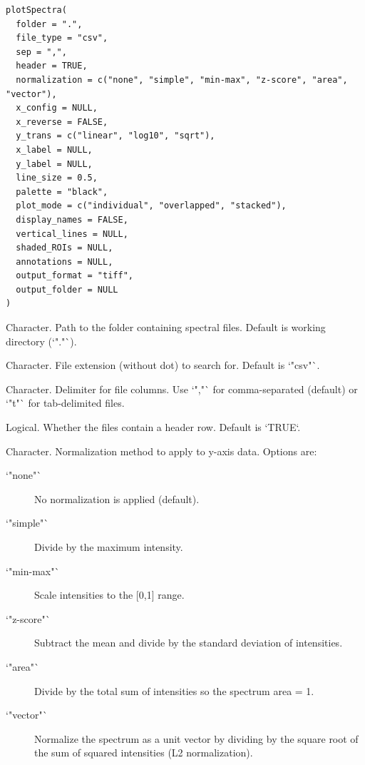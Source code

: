 \documentclass[a4paper]{book}
\begin{document}
%
\begin{Usage}
\begin{verbatim}
plotSpectra(
  folder = ".",
  file_type = "csv",
  sep = ",",
  header = TRUE,
  normalization = c("none", "simple", "min-max", "z-score", "area", "vector"),
  x_config = NULL,
  x_reverse = FALSE,
  y_trans = c("linear", "log10", "sqrt"),
  x_label = NULL,
  y_label = NULL,
  line_size = 0.5,
  palette = "black",
  plot_mode = c("individual", "overlapped", "stacked"),
  display_names = FALSE,
  vertical_lines = NULL,
  shaded_ROIs = NULL,
  annotations = NULL,
  output_format = "tiff",
  output_folder = NULL
)
\end{verbatim}
\end{Usage}
%
\begin{Arguments}
\begin{ldescription}
\item[\code{folder}] Character. Path to the folder containing spectral files. Default is working directory (`"."`).

\item[\code{file\_type}] Character. File extension (without dot) to search for. Default is `"csv"`.

\item[\code{sep}] Character. Delimiter for file columns. Use `","` for comma-separated (default) or `"\bsl{}t"` for tab-delimited files.

\item[\code{header}] Logical. Whether the files contain a header row. Default is `TRUE`.

\item[\code{normalization}] Character. Normalization method to apply to y-axis data. Options are:
\begin{description}

\item[`"none"`] No normalization is applied (default).
\item[`"simple"`] Divide by the maximum intensity.
\item[`"min-max"`] Scale intensities to the [0,1] range.
\item[`"z-score"`] Subtract the mean and divide by the standard deviation of intensities.
\item[`"area"`] Divide by the total sum of intensities so the spectrum area = 1.
\item[`"vector"`] Normalize the spectrum as a unit vector by dividing by the square root of the sum of squared intensities (L2 normalization).


\end{description}
\end{ldescription}
\end{Arguments}
\end{document}
